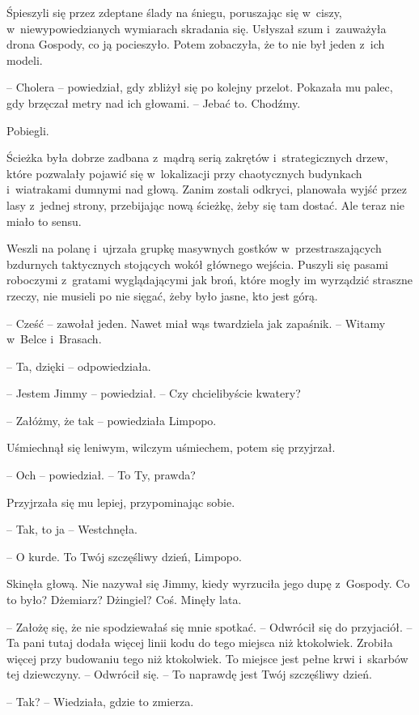 \documentclass[oneside,polish,11pt,sfheadings]{mwbk}
\begin{document}
Śpieszyli się przez zdeptane ślady na śniegu, poruszając się w~ciszy, w~niewypowiedzianych wymiarach skradania się. Usłyszał szum i~zauważyła
drona Gospody, co ją pocieszyło. Potem zobaczyła, że to nie był jeden z~ich modeli.

-- Cholera -- powiedział, gdy zbliżył się po kolejny przelot. Pokazała mu
palec, gdy brzęczał metry nad ich głowami. -- Jebać to. Chodźmy.

Pobiegli.

Ścieżka była dobrze zadbana z~mądrą serią zakrętów i~strategicznych
drzew, które pozwalały pojawić się w~lokalizacji przy chaotycznych
budynkach i~wiatrakami dumnymi nad głową. Zanim zostali odkryci,
planowała wyjść przez lasy z~jednej strony, przebijając nową ścieżkę,
żeby się tam dostać. Ale teraz nie miało to sensu.

Weszli na polanę i~ujrzała grupkę masywnych gostków w~przestraszających
bzdurnych taktycznych stojących wokół głównego wejścia. Puszyli się
pasami roboczymi z~gratami wyglądającymi jak broń, które mogły im
wyrządzić straszne rzeczy, nie musieli po nie sięgać, żeby było jasne,
kto jest górą.

-- Cześć -- zawołał jeden. Nawet miał wąs twardziela jak zapaśnik. -- Witamy w~Belce i~Brasach.

-- Ta, dzięki -- odpowiedziała.

-- Jestem Jimmy -- powiedział. -- Czy chcielibyście kwatery?

-- Załóżmy, że tak -- powiedziała Limpopo.

Uśmiechnął się leniwym, wilczym uśmiechem, potem się przyjrzał. 

-- Och -- powiedział. -- To Ty, prawda?

Przyjrzała się mu lepiej, przypominając sobie. 

-- Tak, to ja -- Westchnęła.

-- O kurde. To Twój szczęśliwy dzień, Limpopo.

Skinęła głową. Nie nazywał się Jimmy, kiedy wyrzuciła jego dupę z~Gospody. Co to było? Dżemiarz? Dżingiel? Coś. Minęły lata.

-- Założę się, że nie spodziewałaś się mnie spotkać. -- Odwrócił się do
przyjaciół. -- Ta pani tutaj dodała więcej linii kodu do tego miejsca niż
ktokolwiek. Zrobiła więcej przy budowaniu tego niż ktokolwiek. To
miejsce jest pełne krwi i~skarbów tej dziewczyny. -- Odwrócił się. -- To
naprawdę jest Twój szczęśliwy dzień.

-- Tak? -- Wiedziała, gdzie to zmierza.
\end{document}
